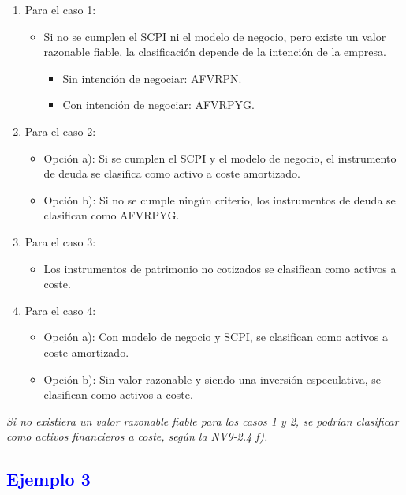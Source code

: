 \begin{enumerate}
    \item Para el caso 1:
    \begin{itemize}
        \item Si no se cumplen el SCPI ni el modelo de negocio, pero existe un valor razonable fiable, la clasificación depende de la intención de la empresa.
        \begin{itemize}
            \item Sin intención de negociar: AFVRPN.
            \item Con intención de negociar: AFVRPYG.
        \end{itemize}
    \end{itemize}

    \item Para el caso 2:
    \begin{itemize}
        \item Opción a): Si se cumplen el SCPI y el modelo de negocio, el instrumento de deuda se clasifica como activo a coste amortizado.
        \item Opción b): Si no se cumple ningún criterio, los instrumentos de deuda se clasifican como AFVRPYG.
    \end{itemize}

    \item Para el caso 3: 
    \begin{itemize}
        \item Los instrumentos de patrimonio no cotizados se clasifican como activos a coste.
    \end{itemize}

    \item Para el caso 4:
    \begin{itemize}
        \item Opción a): Con modelo de negocio y SCPI, se clasifican como activos a coste amortizado.
        \item Opción b): Sin valor razonable y siendo una inversión especulativa, se clasifican como activos a coste.
    \end{itemize}
\end{enumerate}

\textit{Si no existiera un valor razonable fiable para los casos 1 y 2, se podrían clasificar como activos financieros a coste, según la NV9-2.4 f).}

\subsection*{\textcolor{blue}{Ejemplo 3}}

